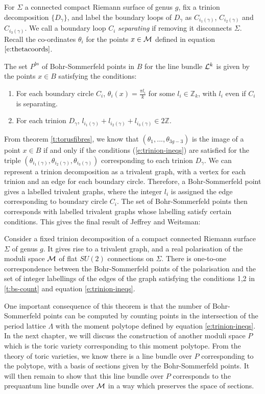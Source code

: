 	For $\Sigma$ a connected compact Riemann surface of genus $g$, fix a trinion decomposition $\{D_\gamma\}$, and label the boundary loops of $D_\gamma$ as $C_{i_1(\gamma)}$, $C_{i_2(\gamma)}$ and $C_{i_3(\gamma)}$. We call a boundary loop $C_i$ \emph{separating} if removing it disconnects $\Sigma$. Recall the co-ordinates $\theta_i$ for the points $x\in \mathcal{M}$ defined in equation $\ref{e:thetacoords}$. 
	\begin{theorem}
		\label{t:bs-count}
		The set $P^{bs}$ of Bohr-Sommerfeld points in $B$ for the line bundle $\mathcal{L}^k$ is given by the points $x\in B$ satisfying the conditions:
		\begin{enumerate}
			\item For each boundary circle $C_i$, $\theta_i(x) = \frac{\pi l_i}{k}$ for some $l_i \in \mathbb{Z}_k$, with $l_i$ even if $C_i$ is separating.
			\item For each trinion $D_\gamma$, $l_{i_1(\gamma)} + l_{i_2(\gamma)} + l_{i_3(\gamma)} \in 2\mathbb{Z}$.
		\end{enumerate}
	\end{theorem}
	From theorem \ref{t:torusfibres}, we know that $(\theta_1,...,\theta_{3g-3})$ is the image of a point $x\in B$ if and only if the conditions (\ref{e:trinion-ineqs}) are satisfied for the triple $(\theta_{i_1(\gamma)}, \theta_{i_2(\gamma)}, \theta_{i_3(\gamma)})$ corresponding to each trinion $D_\gamma$. We can represent a trinion decomposition as a trivalent graph, with a vertex for each trinion and an edge for each boundary circle. Therefore, a Bohr-Sommerfeld point gives a labelled trivalent graphs, where the integer $l_i$ is assigned the edge corresponding to boundary circle $C_i$. The set of Bohr-Sommerfeld points then corresponds with labelled trivalent graphs whose labelling satisfy certain conditions. This gives the final result of Jeffrey and Weitsman:
	\begin{theorem}
		Consider a fixed trinion decomposition of a compact connected Riemann surface $\Sigma$ of genus $g$. It gives rise to a trivalent graph, and a real polarisation of the moduli space $\mathcal{M}$ of flat $SU(2)$ connections on $\Sigma$. There is one-to-one correspondence between the Bohr-Sommerfeld points of the polarisation and the set of integer labellings of the edges of the graph satisfying the conditions 1,2 in \ref{t:bs-count} and equation \ref{e:trinion-ineqs}.
	\end{theorem}
	One important consequence of this theorem is that the number of Bohr-Sommerfeld points can be computed by counting points in the intersection of the period lattice $\Lambda$ with the moment polytope defined by equation \ref{e:trinion-ineqs}. In the next chapter, we will discuss the construction of another moduli space $P$ which is the toric variety corresponding to this moment polytope. From the theory of toric varieties, we know there is a line bundle over $P$ corresponding to the polytope, with a basis of sections given by the Bohr-Sommerfeld points. It will then remain to show that this line bundle over $P$ corresponds to the prequantum line bundle over $\mathcal{M}$ in a way which preserves the space of sections.
	
	